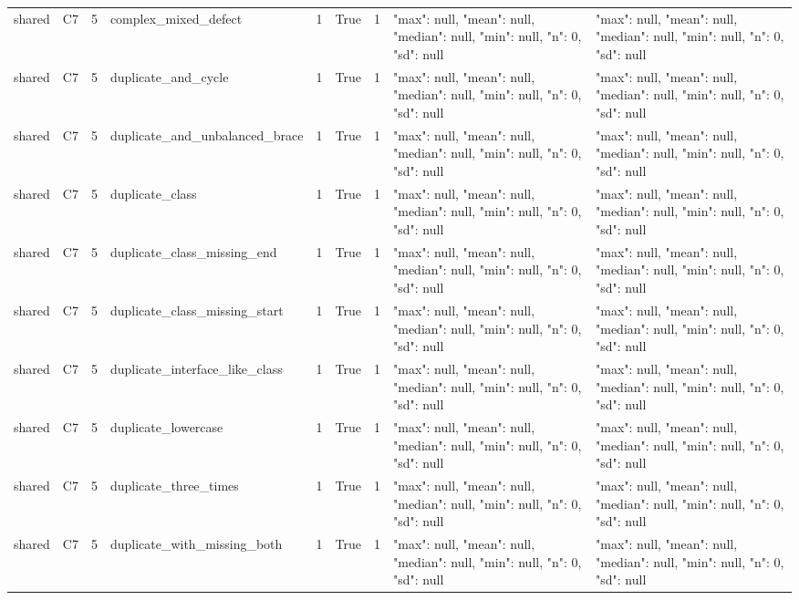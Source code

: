 \begin{tabular}{lllllllll}
shared & C7 & 5 & complex\_mixed\_defect & 1 & True & 1 & {"max": null, "mean": null, "median": null, "min": null, "n": 0, "sd": null} & {"max": null, "mean": null, "median": null, "min": null, "n": 0, "sd": null} \\
shared & C7 & 5 & duplicate\_and\_cycle & 1 & True & 1 & {"max": null, "mean": null, "median": null, "min": null, "n": 0, "sd": null} & {"max": null, "mean": null, "median": null, "min": null, "n": 0, "sd": null} \\
shared & C7 & 5 & duplicate\_and\_unbalanced\_brace & 1 & True & 1 & {"max": null, "mean": null, "median": null, "min": null, "n": 0, "sd": null} & {"max": null, "mean": null, "median": null, "min": null, "n": 0, "sd": null} \\
shared & C7 & 5 & duplicate\_class & 1 & True & 1 & {"max": null, "mean": null, "median": null, "min": null, "n": 0, "sd": null} & {"max": null, "mean": null, "median": null, "min": null, "n": 0, "sd": null} \\
shared & C7 & 5 & duplicate\_class\_missing\_end & 1 & True & 1 & {"max": null, "mean": null, "median": null, "min": null, "n": 0, "sd": null} & {"max": null, "mean": null, "median": null, "min": null, "n": 0, "sd": null} \\
shared & C7 & 5 & duplicate\_class\_missing\_start & 1 & True & 1 & {"max": null, "mean": null, "median": null, "min": null, "n": 0, "sd": null} & {"max": null, "mean": null, "median": null, "min": null, "n": 0, "sd": null} \\
shared & C7 & 5 & duplicate\_interface\_like\_class & 1 & True & 1 & {"max": null, "mean": null, "median": null, "min": null, "n": 0, "sd": null} & {"max": null, "mean": null, "median": null, "min": null, "n": 0, "sd": null} \\
shared & C7 & 5 & duplicate\_lowercase & 1 & True & 1 & {"max": null, "mean": null, "median": null, "min": null, "n": 0, "sd": null} & {"max": null, "mean": null, "median": null, "min": null, "n": 0, "sd": null} \\
shared & C7 & 5 & duplicate\_three\_times & 1 & True & 1 & {"max": null, "mean": null, "median": null, "min": null, "n": 0, "sd": null} & {"max": null, "mean": null, "median": null, "min": null, "n": 0, "sd": null} \\
shared & C7 & 5 & duplicate\_with\_missing\_both & 1 & True & 1 & {"max": null, "mean": null, "median": null, "min": null, "n": 0, "sd": null} & {"max": null, "mean": null, "median": null, "min": null, "n": 0, "sd": null} \\

\end{tabular}
